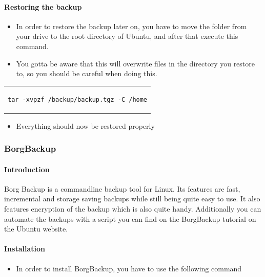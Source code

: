 \documentclass[a4paper,10pt]{article}
\begin{document}
\paragraph{Restoring the backup}

\begin{itemize}[leftmargin=*]
\item In order to restore the backup later on, you have to move the folder from your drive to the root directory of Ubuntu, and after that execute this command.
\item You gotta be aware that this will overwrite files in the directory you restore to, so you should be careful when doing this.
\end{itemize}

\begin{center}
\begin{tabular}{c}
\begin{lstlisting}
tar -xvpzf /backup/backup.tgz -C /home
\end{lstlisting}
\end{tabular}
\end{center}

\begin{itemize}[leftmargin=*]
\item Everything should now be restored properly
\end{itemize}

\subsubsection{BorgBackup}

\paragraph{Introduction}
Borg Backup is a commandline backup tool for Linux. Its features are fast, incremental and storage saving backups while still being quite easy to use. It also features encryption of the backup which is also quite handy. Additionally you can automate the backups with a script you can find on the BorgBackup tutorial on the Ubuntu website.

\paragraph{Installation}

\begin{itemize}[leftmargin=*]
\item In order to install BorgBackup, you have to use the following command
\end{itemize}
\end{document}
